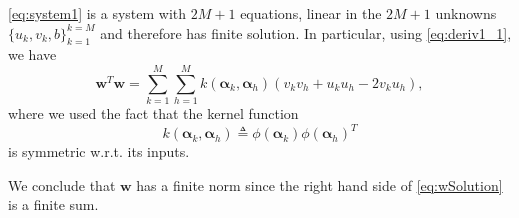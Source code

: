 \documentclass[draftcls,onecolumn,12pt]{IEEEtran}
\newcommand{\wrt}{w.r.t. }
\begin{document}
	\eqref{eq:system1} is a system with $2M + 1$ equations, linear in the $2M + 1$ unknowns $\{u_k,v_k,b\}_{k=1}^{k=M}$ and therefore has finite solution. In particular, using \eqref{eq:deriv1_1}, we have
	\begin{equation}
	\label{eq:wSolution}
	\bm{w}^T\bm{w} =  \sum_{k=1}^{M} \sum_{h=1}^{M} k(\bm{\alpha}_k,\bm{\alpha}_h) (v_kv_h + u_ku_h -2 v_ku_h),
	\end{equation}
	where we used the fact that the kernel function
	\begin{equation}
	k(\bm{\alpha}_k,\bm{\alpha}_h) \triangleq \phi(\bm{\alpha}_k) \phi(\bm{\alpha}_h)^T
	\end{equation}
	 is symmetric \wrt its inputs. 
	
	
	We conclude that $\bm{w}$ has a finite norm since the right hand side of \eqref{eq:wSolution} is a finite sum.
	  


%
%
\renewcommand*{\bibfont}{\footnotesize}

\printbibliography
\end{document}
